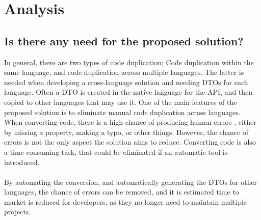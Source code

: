 \section{Analysis \label{sec:analysis}}

\subsection{Is there any need for the proposed solution?}
In general, there are two types of code duplication; Code duplication within the same language, and code duplication across multiple languages.
The latter is needed when developing a cross-language solution and needing DTOs for each language.
Often a DTO is created in the native language for the API, and then copied to other languages that may use it.
One of the main features of the proposed solution is to eliminate manual code duplication across languages. 
When converting code, there is a high chance of producing human errors \cite{code-duplicate-template}, either by missing a property, making a typo, or other things.
However, the chance of errors is not the only aspect the solution aims to reduce.
Converting code is also a time-consuming task, that could be eliminated if an automatic tool is introduced.
\\ \\
By automating the conversion, and automatically generating the DTOs for other languages, the chance of errors can be removed, and it is estimated time to market is reduced for developers, as they no longer need to maintain multiple projects.

